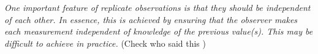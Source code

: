 \documentclass[12pt, a4paper]{report}
\theoremstyle{plain}
\theoremstyle{definition}
\theoremstyle{remark}
\begin{document}
	
	
	\emph{
		One important feature of replicate observations is that they should be independent
		of each other. In essence, this is achieved by ensuring that the observer makes each
		measurement independent of knowledge of the previous value(s). This may be difficult
		to achieve in practice.} (Check who said this
	)
	
	


	


\end{document}
